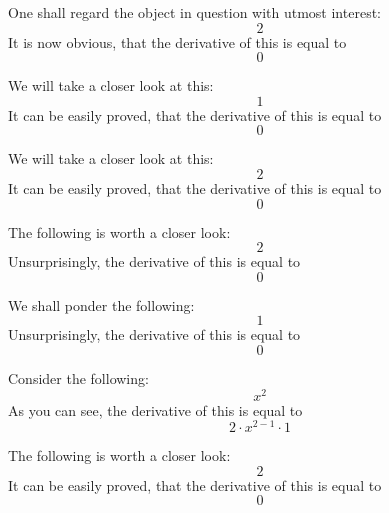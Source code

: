 \documentclass{article}
\begin{document}
One shall regard the object in question with utmost interest:
\begin{equation}
2 
\end{equation}
It is now obvious, that the derivative of this is equal to
\begin{equation}
0 
\end{equation}

We will take a closer look at this:
\begin{equation}
1 
\end{equation}
It can be easily proved, that the derivative of this is equal to
\begin{equation}
0 
\end{equation}

We will take a closer look at this:
\begin{equation}
2 
\end{equation}
It can be easily proved, that the derivative of this is equal to
\begin{equation}
0 
\end{equation}

The following is worth a closer look:
\begin{equation}
2 
\end{equation}
Unsurprisingly, the derivative of this is equal to
\begin{equation}
0 
\end{equation}

We shall ponder the following:
\begin{equation}
1 
\end{equation}
Unsurprisingly, the derivative of this is equal to
\begin{equation}
0 
\end{equation}

Consider the following:
\begin{equation}
x ^{2 } 
\end{equation}
As you can see, the derivative of this is equal to
\begin{equation}
2 \cdot x ^{2 - 1 } \cdot 1 
\end{equation}

The following is worth a closer look:
\begin{equation}
2 
\end{equation}
It can be easily proved, that the derivative of this is equal to
\begin{equation}
0 
\end{equation}
\end{document}
